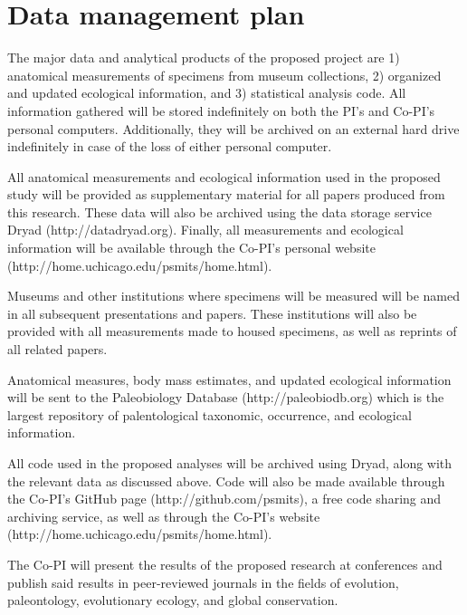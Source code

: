 \documentclass[11pt,letterpaper]{article}
\begin{document}
\setcounter{secnumdepth}{0}
\section{Data management plan}

The major data and analytical products of the proposed project are 1) anatomical measurements of specimens from museum collections, 2) organized and updated ecological information, and 3) statistical analysis code. All information gathered will be stored indefinitely on both the PI's and Co-PI's personal computers. Additionally, they will be archived on an external hard drive indefinitely in case of the loss of either personal computer.

All anatomical measurements and ecological information used in the proposed study will be provided as supplementary material for all papers produced from this research. These data will also be archived using the data storage service Dryad (http://datadryad.org). Finally, all measurements and ecological information will be available through the Co-PI's personal website (http://home.uchicago.edu/psmits/home.html).

Museums and other institutions where specimens will be measured will be named in all subsequent presentations and papers. These institutions will also be provided with all measurements made to housed specimens, as well as reprints of all related papers.

Anatomical measures, body mass estimates, and updated ecological information will be sent to the Paleobiology Database (http://paleobiodb.org) which is the largest repository of palentological taxonomic, occurrence, and ecological information. 

All code used in the proposed analyses will be archived using Dryad, along with the relevant data as discussed above. Code will also be made available through the Co-PI's GitHub page (http://github.com/psmits), a free code sharing and archiving service, as well as through the Co-PI's website (http://home.uchicago.edu/psmits/home.html).

The Co-PI will present the results of the proposed research at conferences and publish said results in peer-reviewed journals in the fields of evolution, paleontology, evolutionary ecology, and global conservation.
\end{document}
